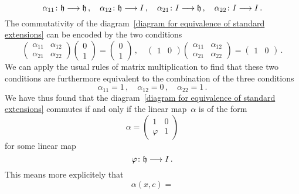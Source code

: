 \begin{fluff}
\begin{enumerate}[resume*]
      \[
        \alpha_{11}
        \colon
        \hlie
        \to
        \hlie \,,
        \quad
        \alpha_{12}
        \colon
        \hlie
        \to
        I \,,
        \quad
        \alpha_{21}
        \colon
        I
        \to
        \hlie \,,
        \quad
        \alpha_{22}
        \colon
        I
        \to
        I \,.
      \]
      The commutativity of the diagram~\eqref{diagram for equivalence of standard extensions} can be encoded by the two conditions
      \[
        \begin{pmatrix}
          \alpha_{11} & \alpha_{12} \\
          \alpha_{21} & \alpha_{22}
        \end{pmatrix}
        \begin{pmatrix}
          0 \\
          1
        \end{pmatrix}
        =
        \begin{pmatrix}
          0 \\
          1
        \end{pmatrix} \,,
        \quad
        \begin{pmatrix}
          1 & 0
        \end{pmatrix}
        \begin{pmatrix}
          \alpha_{11} & \alpha_{12} \\
          \alpha_{21} & \alpha_{22}
        \end{pmatrix}
        =
        \begin{pmatrix}
          1 & 0
        \end{pmatrix} \,.
      \]
      We can apply the usual rules of matrix multiplication to find that these two conditions are furthermore equivalent to the combination of the three conditions
      \[
        \alpha_{11} = 1 \,,
        \quad
        \alpha_{12} = 0 \,,
        \quad
        \alpha_{22} = 1 \,.
      \]
      We have thus found that the diagram~\eqref{diagram for equivalence of standard extensions} commutes if and only if the linear map~$\alpha$ is of the form
      \[
        \alpha
        =
        \begin{pmatrix}
          1       & 0 \\
          \varphi & 1
        \end{pmatrix}
      \]
      for some linear map
      \[
        \varphi
        \colon
        \hlie
        \to
        I \,.
      \]
      This means more explicitely that
      \[
        \alpha(x,c)
        =
\]
\end{enumerate}
\end{fluff}
